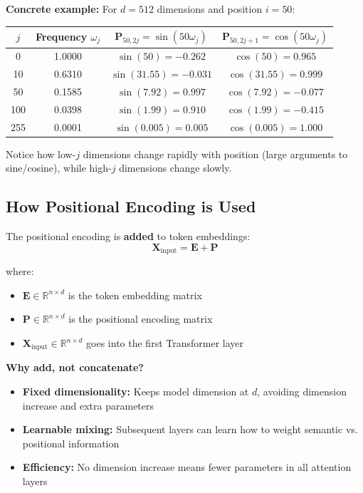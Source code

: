 \documentclass{article}
\begin{document}
\textbf{Concrete example:} For $d = 512$ dimensions and position $i = 50$:

\begin{center}
\begin{tabular}{c|c|c|c}
$j$ & Frequency $\omega_j$ & $\mathbf{P}_{50,2j} = \sin(50 \omega_j)$ & $\mathbf{P}_{50,2j+1} = \cos(50 \omega_j)$ \\
\hline
0 & 1.0000 & $\sin(50) = -0.262$ & $\cos(50) = 0.965$ \\
10 & 0.6310 & $\sin(31.55) = -0.031$ & $\cos(31.55) = 0.999$ \\
50 & 0.1585 & $\sin(7.92) = 0.997$ & $\cos(7.92) = -0.077$ \\
100 & 0.0398 & $\sin(1.99) = 0.910$ & $\cos(1.99) = -0.415$ \\
255 & 0.0001 & $\sin(0.005) = 0.005$ & $\cos(0.005) = 1.000$ \\
\end{tabular}
\end{center}

Notice how low-$j$ dimensions change rapidly with position (large arguments to sine/cosine), while high-$j$ dimensions change slowly.

\subsection{How Positional Encoding is Used}

The positional encoding is \textbf{added} to token embeddings:
\[
\mathbf{X}_{\text{input}} = \mathbf{E} + \mathbf{P}
\]

where:
\begin{itemize}
\item $\mathbf{E} \in \mathbb{R}^{n \times d}$ is the token embedding matrix
\item $\mathbf{P} \in \mathbb{R}^{n \times d}$ is the positional encoding matrix
\item $\mathbf{X}_{\text{input}} \in \mathbb{R}^{n \times d}$ goes into the first Transformer layer
\end{itemize}

\textbf{Why add, not concatenate?}
\begin{itemize}
\item \textbf{Fixed dimensionality:} Keeps model dimension at $d$, avoiding dimension increase and extra parameters
\item \textbf{Learnable mixing:} Subsequent layers can learn how to weight semantic vs. positional information
\item \textbf{Efficiency:} No dimension increase means fewer parameters in all attention layers
\end{itemize}
\end{document}
